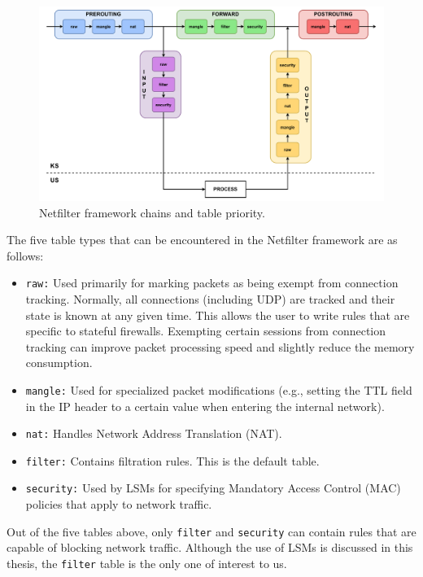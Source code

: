 \begin{figure}[h]
    \centering
    \includegraphics[width=\textwidth,keepaspectratio]{figures/netfilter_struct.pdf}
    \caption{Netfilter framework chains and table priority.}
    \label{background:firewall:fig:netfilter}
\end{figure}

The five table types that can be encountered in the Netfilter framework are as follows:

\begin{itemize}
    \item \texttt{raw:} Used primarily for marking packets as being exempt from
          connection tracking. Normally, all connections (including UDP) are
          tracked and their state is known at any given time. This allows the
          user to write rules that are specific to stateful firewalls. Exempting
          certain sessions from connection tracking can improve packet processing
          speed and slightly reduce the memory consumption.
    \item \texttt{mangle:} Used for specialized packet modifications (e.g.,
          setting the TTL field in the IP header to a certain value when entering
          the internal network).
    \item \texttt{nat:} Handles Network Address Translation (NAT).
    \item \texttt{filter:} Contains filtration rules. This is the default table.
    \item \texttt{security:} Used by LSMs for specifying Mandatory Access Control
          (MAC) policies that apply to network traffic.
\end{itemize}

Out of the five tables above, only \texttt{filter} and \texttt{security} can
contain rules that are capable of blocking network traffic. Although the use of
LSMs is discussed in this thesis, the \texttt{filter} table is the only one
of interest to us.

